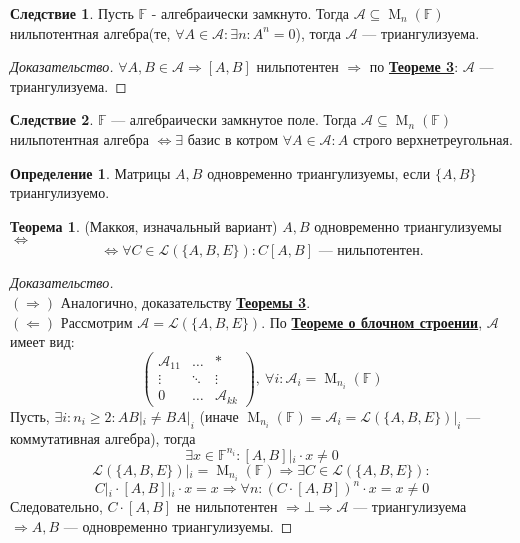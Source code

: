 \documentclass[a4paper, 14pt]{extarticle}
\theoremstyle{definition}
\newtheorem{definition}{Определение}
\newtheorem{theorem}{Теорема}
\newtheorem{conseq}{Следствие}
\begin{document}
\begin{conseq}
	Пусть \(\mathbb{F}\) - алгебраически замкнуто. Тогда \(\mathcal{A} \subseteq \operatorname{M}_n(\mathbb{F})\) нильпотентная алгебра(те, \(\forall A \in \mathcal{A} : \exists n : A^n = 0\)), тогда \(\mathcal{A}\) --- триангулизуема.
\end{conseq}

\begin{proof}[Доказательство]
	\(\forall A, B \in \mathcal{A} \Rightarrow [A, B]\) нильпотентен \(\Rightarrow\) по \hyperref[th4_1]{\textbf{Теореме 3}}: \(\mathcal{A}\) --- триангулизуема.
\end{proof}

\begin{conseq}
	\(\mathbb{F}\) --- алгебраически замкнутое поле. Тогда \(\mathcal{A} \subseteq \operatorname{M}_n(\mathbb{F})\) нильпотентная алгебра \(\Leftrightarrow \exists\) базис в котром \(\forall A \in \mathcal{A} : A\) строго верхнетреугольная.
\end{conseq}

\begin{definition}
	Матрицы \(A, B\) одновременно триангулизуемы, если \(\{A, B\}\) триангулизуемо.
\end{definition}

\begin{theorem}
	(Маккоя, изначальный вариант) \(A, B\) одновременно триангулизуемы \(\Leftrightarrow\)
	\[\Leftrightarrow \forall C \in \mathcal{L}(\{A, B, E\}) : C[A, B] \text{ --- нильпотентен.}\]
\end{theorem}

\begin{proof}[Доказательство]
	~\\
	\((\Rightarrow)\) Аналогично, доказательству \hyperref[th4_1]{\textbf{Теоремы 3}}.\\
	\((\Leftarrow)\) Рассмотрим \(\mathcal{A} = \mathcal{L}(\{A, B, E\})\). По \hyperref[th3_1]{\textbf{Теореме о блочном строении}}, \(\mathcal{A}\) имеет вид:
	\[\left(
		\begin{array}{ccc}
			\mathcal{A}_{11} & \hdots & * \\
			\vdots & \ddots & \vdots \\
			0 & \hdots & \mathcal{A}_{kk}
		\end{array}
	\right),\ \forall i : \mathcal{A}_i = \operatorname{M}_{n_i}(\mathbb{F})\]
	Пусть, \(\exists i : n_i \geqslant 2: AB|_i \neq BA|_i\) (иначе \(\operatorname{M}_{n_i}(\mathbb{F}) = \mathcal{A}_i = \mathcal{L}(\{A, B, E\})|_i\) --- коммутативная алгебра), тогда \[\exists x \in \mathbb{F}^{n_i} : [A, B] \left|_i \right. \cdot x \neq 0\]
	\[\mathcal{L}(\{A, B, E\}) \left|_i \right. = \operatorname{M}_{n_i}(\mathbb{F}) \Rightarrow \exists C \in \mathcal{L}(\{A, B, E\}):\]
	\[C \left|_i \right. \cdot [A, B] \left|_i \right. \cdot x = x \Rightarrow \forall n : (C \cdot [A, B])^n \cdot x = x \neq 0\]
	Следовательно, \(C \cdot [A, B]\) не нильпотентен \(\Rightarrow \bot \Rightarrow \mathcal{A}\) --- триангулизуема \(\Rightarrow A, B\) --- одновременно триангулизуемы.
\end{proof}
\end{document}
